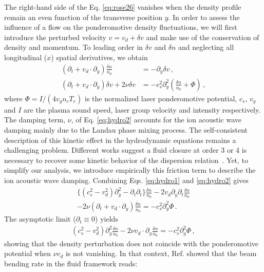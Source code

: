 \documentclass[%
 reprint,
 amsmath,amssymb,
 aps,
]{revtex4-1}
\begin{document}
The right-hand side of the Eq. \eqref{eq:rose26} vanishes when the density profile remain an even function of the transverse position $y$. In order to assess the influence of a flow on the ponderomotive density fluctuations, we will first introduce the perturbed velocity $v = v_d +\delta v$ and  make use of the conservation of density and momentum. To leading order in $\delta v$ and $\delta n$ and neglecting all longitudinal ($x$) spatial derivatives, we obtain 
\begin{align}
(\partial_t + v_d  \cdot \partial_y) \frac{  \delta n }{n_0} &= - \partial_y\delta v \, ,\label{eq:hydro1} \\
(\partial_t + v_d  \cdot \partial_y) \delta v + 2\nu \delta v  &= - c_s^2\partial_y^2\left(\frac{  \delta n }{n_0} +  \Phi  \right) \, ,\label{eq:hydro2} 
\end{align}
where $ \Phi = I /(4v_g n_c T_e )$ is the normalized laser ponderomotive potential,  $c_s$, $v_g$ and $I$  are the plasma sound speed, laser group velocity and intensity respectively.
The damping term, $\nu$, of Eq. \eqref{eq:hydro2} accounts for the ion acoustic wave damping mainly due to the Landau phase mixing process. The self-consistent description of this kinetic effect in the hydrodynamic equations remains a challenging problem. Different works suggest a fluid closure at order 3 or 4 is necessary to recover some kinetic behavior of the dispersion relation~\cite{PRL_Hammett_1990,POF_Chang_1992}. Yet, to simplify our analysis, we introduce empirically this friction term to describe the ion acoustic wave damping.
 Combining Eqs. \eqref{eq:hydro1} and \eqref{eq:hydro2} gives 
\begin{align}
 \{ (c_s^2-v_d^2)\partial_y^2 -\partial_t \partial_t\}    \frac{  \delta n }{n_0} - 2 v_d \partial_y  \partial_t \frac{  \delta n }{n_0}   \nonumber \\
-2\nu  (\partial_t + v_d  \cdot \partial_y) \frac{  \delta n }{n_0}   = - c_s^2\partial_y^2 \Phi  \, .\label{eq:hydro3} 
\end{align}
The asymptotic limit ($\partial_t\equiv 0$) yields 
\begin{align}
 (c_s^2-v_d^2)\partial_y^2    \frac{  \delta n }{n_0}  
-2\nu    v_d  \cdot \partial_y \frac{  \delta n }{n_0}   = - c_s^2\partial_y^2 \Phi  \, , \label{eq:hydro3b} 
\end{align}
showing that the density perturbation does not coincide with the ponderomotive potential when $\nu    v_d $ is not vanishing.
In that context, Ref. \cite{POP_Rose_96,POP_Rose_97} showed that the beam bending rate in the fluid framework reads:
\end{document}
